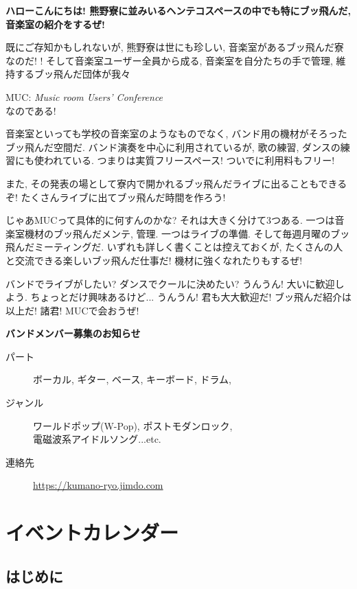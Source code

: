 \documentclass[10pt,b5jsbook,dvips,dvipdfmx,openany]{jsbook}
\theoremstyle{definition}
\begin{document}
	{\fontsize{17pt}{23pt}\selectfont \bf ハローこんにちは! 熊野寮に並みいるヘンテコスペースの中でも特にブッ飛んだ, 音楽室の紹介をするぜ! 

	既にご存知かもしれないが, 熊野寮は世にも珍しい, 音楽室があるブッ飛んだ寮なのだ! ! 
	そして音楽室ユーザー全員から成る, 音楽室を自分たちの手で管理, 維持するブッ飛んだ団体が我々
	
	MUC:  \textit{Music room Users' Conference}  \\ なのである! 

	音楽室といっても学校の音楽室のようなものでなく, バンド用の機材がそろったブッ飛んだ空間だ. バンド演奏を中心に利用されているが, 歌の練習, ダンスの練習にも使われている. つまりは実質フリースペース! ついでに利用料もフリー! 

	また, その発表の場として寮内で開かれるブッ飛んだライブに出ることもできるぞ! たくさんライブに出てブッ飛んだ時間を作ろう! 

	じゃあMUCって具体的に何すんのかな? それは大きく分けて3つある. 一つは音楽室機材のブッ飛んだメンテ, 管理. 一つはライブの準備. そして毎週月曜のブッ飛んだミーティングだ. いずれも詳しく書くことは控えておくが, たくさんの人と交流できる楽しいブッ飛んだ仕事だ! 機材に強くなれたりもするぜ! 

	バンドでライブがしたい? ダンスでクールに決めたい? うんうん! 大いに歓迎しよう. ちょっとだけ興味あるけど... うんうん! 君も大大歓迎だ! ブッ飛んだ紹介は以上だ! 諸君! MUCで会おうぜ! 
		
		}


\begin{boxnote}
{\Large
	\textbf{バンドメンバー募集のお知らせ}
	\begin{description}
	\item[パート] ボーカル, ギター, ベース, キーボード, ドラム, 
	\item[ジャンル] ワールドポップ(W-Pop), ポストモダンロック, \\ 電磁波系アイドルソング...etc.
	\item[連絡先] \url{https://kumano-ryo.jimdo.com}
	\end{description}
	}
	\end{boxnote}


\newpage

	\section{イベントカレンダー}

		\subsection{はじめに}
\end{document}
